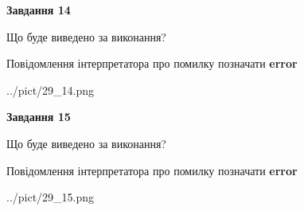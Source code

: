 \documentclass[11pt, ukrainian]{article}
\begin{document}
{\begin {large}
{\begin {center}\textbf{Завдання 14}\end {center}}\par
Що буде виведено за виконання? \par
Повідомлення інтерпретатора про помилку позначати \textbf{error}

\begin{center}
	{../pict/29_14.png}
\end{center}
\newpage

{\begin {center}\textbf{Завдання 15}\end {center}}\par
Що буде виведено за виконання? \par
Повідомлення інтерпретатора про помилку позначати \textbf{error}

\begin{center}
	{../pict/29_15.png}
\end{center}
\newpage

\end {large}}
\end{document}
